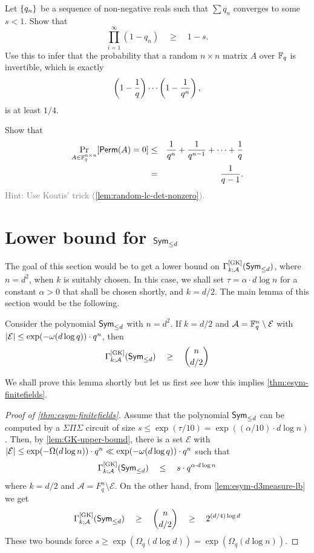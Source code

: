 \begin{exercise}
  Let $\left\{q_n\right\}$ be a sequence of non-negative reals such that $\sum q_n$ converges to some $s < 1$. 
Show that 
  \[
  \prod_{i=1}^{\infty} (1 - q_n) \quad \geq \quad 1 - s. 
  \]
  Use this to infer that the probability that a random $n\times n$ matrix $A$ over $\mathbb{F}_q$ is invertible, which is exactly
  \[
  \left(1 - \frac{1}{q}\right)\cdots \left(1 - \frac{1}{q^{n}}\right),
  \]
  is at least $1/4$. 
\end{exercise}

\begin{exercise}
  Show that
  \begin{eqnarray*}
    \Pr_{A \in \mathbb{F}_q^{n\times n}}[\operatorname{\mathsf{Perm}}(A) = 0] & \leq &  \frac{1}{q^n} + \frac{1}{q^{n-1}} + \cdots + \frac{1}{q}\\
    & = & \frac{1}{q-1}.
  \end{eqnarray*}
  \textcolor{gray}{Hint: Use Koutis' trick (\autoref{lem:random-lc-det-nonzero}).}
\end{exercise}

\section{Lower bound for $\operatorname{\mathsf{Sym}}_{\leq d}$}

The goal of this section would be to get a lower bound on $\Gamma^{\mathrm{[GK]}}_{k;\mathcal{A}}(\operatorname{\mathsf{Sym}}_{\leq d})$, where $n = d^2$, when $k$ is suitably chosen. In this case, we shall set $\tau = \alpha \cdot d \log n$ for a constant $\alpha>0$ that shall be chosen shortly, and $k = d/2$. The main lemma of this section would be the following. 

\begin{lemma}\label{lem:esym-d3measure-lb}
Consider the polynomial $\operatorname{\mathsf{Sym}}_{\leq d}$ with $n = d^2$. If $k = d/2$ and $\mathcal{A} = \mathbb{F}_q^n \setminus \mathcal{E}$ with $\left|\mathcal{E}\right| \leq \exp(-\omega(d\log q)) \cdot  q^n$, then
\[
\Gamma^{\mathrm{[GK]}}_{k;\mathcal{A}}(\operatorname{\mathsf{Sym}}_{\leq d}) \quad \geq \quad \binom{n}{d/2}
\]
\end{lemma}

\noindent
We shall prove this lemma shortly but let us first see how this implies \autoref{thm:esym-finitefields}. 

\begin{proof}[Proof of \autoref{thm:esym-finitefields}]
Assume that the polynomial $\operatorname{\mathsf{Sym}}_{\leq d}$ can be computed by a $\Sigma\Pi\Sigma$ circuit of size $s \leq \exp(\tau/10) = \exp((\alpha/10) \cdot d \log n)$. Then, by \autoref{lem:GK-upper-bound}, there is a set $\mathcal{E}$ with $\left|\mathcal{E}\right| \leq \exp(-\Omega(d\log n)) \cdot q^n \ll \exp(-\omega(d \log q)) \cdot q^n$ such that
\[
\Gamma^{\mathrm{[GK]}}_{k;\mathcal{A}}(\operatorname{\mathsf{Sym}}_{\leq d}) \quad \leq \quad s \cdot q^{\alpha\cdot d\log n}
\]
where $k = d/2$ and $\mathcal{A} = F_q^n \setminus \mathcal{E}$. On the other hand, from \autoref{lem:esym-d3measure-lb} we get
\[
\Gamma^{\mathrm{[GK]}}_{k;\mathcal{A}}(\operatorname{\mathsf{Sym}}_{\leq d}) \quad \geq \quad \binom{n}{d/2} \quad \geq \quad 2^{(d/4) \log d}
\]
These two bounds force $s \geq \exp(\Omega_q(d \log d)) = \exp(\Omega_q(d\log n))$. 
\end{proof}

